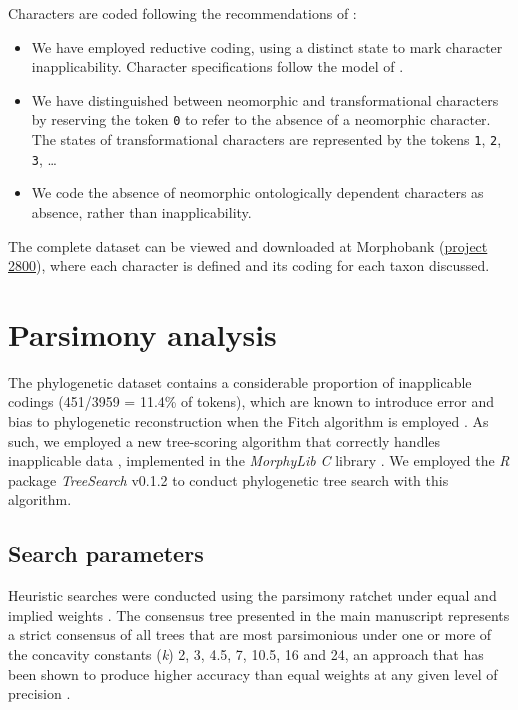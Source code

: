 \documentclass[openany]{book}
\theoremstyle{definition}
\theoremstyle{definition}
\theoremstyle{definition}
\theoremstyle{remark}
\begin{document}
Characters are coded following the recommendations of
\citet{Brazeau2018}:

\begin{itemize}
\item
  We have employed reductive coding, using a distinct state to mark
  character inapplicability. Character specifications follow the model
  of \citet{Sereno2007}.
\item
  We have distinguished between neomorphic and transformational
  characters \citep[sensu][]{Sereno2007} by reserving the token
  \texttt{0} to refer to the absence of a neomorphic character. The
  states of transformational characters are represented by the tokens
  \texttt{1}, \texttt{2}, \texttt{3}, \ldots{}
\item
  We code the absence of neomorphic ontologically dependent characters
  \citep[sensu][]{Vogt2017} as absence, rather than inapplicability.
\end{itemize}

The complete dataset can be viewed and downloaded at Morphobank
(\href{https://morphobank.org/permalink/?P2800}{project 2800}), where
each character is defined and its coding for each taxon discussed.

\hypertarget{treesearch}{%
\chapter{Parsimony analysis}\label{treesearch}}

The phylogenetic dataset contains a considerable proportion of
inapplicable codings (451/3959 = 11.4\% of tokens), which are known to
introduce error and bias to phylogenetic reconstruction when the Fitch
algorithm is employed \citep{Maddison1993, Brazeau2018}. As such, we
employed a new tree-scoring algorithm that correctly handles
inapplicable data \citep{Brazeau2018}, implemented in the
\emph{MorphyLib} \emph{C} library \citep{Brazeau2017Morphylib}. We
employed the \emph{R} package \emph{TreeSearch} v0.1.2
\citep{Smith2018TreeSearch} to conduct phylogenetic tree search with
this algorithm.

\hypertarget{search-parameters}{%
\section{Search parameters}\label{search-parameters}}

Heuristic searches were conducted using the parsimony ratchet
\citep{Nixon1999} under equal and implied weights \citep{Goloboff1997}.
The consensus tree presented in the main manuscript represents a strict
consensus of all trees that are most parsimonious under one or more of
the concavity constants (\emph{k}) 2, 3, 4.5, 7, 10.5, 16 and 24, an
approach that has been shown to produce higher accuracy than equal
weights at any given level of precision \citep{Smith2017}.
\end{document}
